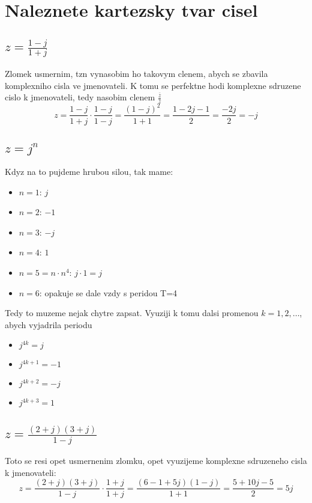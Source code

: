 \newpage

\section{Naleznete kartezsky tvar cisel}
\subsection{$z=\frac{1-j}{1+j}$}
Zlomek usmernim, tzn vynasobim ho takovym clenem, abych se zbavila komplexniho cisla ve jmenovateli. K tomu se perfektne hodi komplexne sdruzene cislo k jmenovateli, tedy nasobim clenem $\frac{\bar{z}}{\bar{z}}$
$$z=\frac{1-j}{1+j}\cdot \frac{1-j}{1-j} =\frac{(1-j)^2}{1+1}=\frac{1-2j-1}{2}=\frac{-2j}{2}=-j$$

\subsection{$z=j^n$}
Kdyz na to pujdeme hrubou silou, tak mame:
\begin{itemize}
\item $n=1$: $j$
\item $n=2$: $-1$
\item $n=3$: $-j$
\item $n=4$: $1$
\item $n=5 = n\cdot n^4$: $j\cdot1 = j$
\item $n=6$: opakuje se dale vzdy s peridou T=4
\end{itemize}

Tedy to muzeme nejak chytre zapsat. Vyuziji k tomu dalsi promenou $k=1,2,\dots $, abych vyjadrila periodu
\begin{itemize}
\item $j^{4k}=j$
\item $j^{4k+1}=-1$
\item $j^{4k+2}=-j$
\item $j^{4k+3}=1$
\end{itemize}

\subsection{$z=\frac{(2+j)(3+j)}{1-j}$}

Toto se resi opet usmernenim zlomku, opet vyuzijeme komplexne sdruzeneho cisla k jmenovateli:
$$z=\frac{(2+j)(3+j)}{1-j}\cdot \frac{1+j}{1+j}=\frac{(6-1+5j)(1-j)}{1+1}=\frac{5+10j-5}{2}=5j$$

